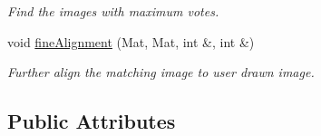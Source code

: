 \begin{DoxyCompactItemize}
\begin{DoxyCompactList}\small\item\em \-Find the images with maximum votes. \end{DoxyCompactList}\item 
\hypertarget{classMatchingImage_a79f66ca5dc56f8566dde276e1340a961}{void \hyperlink{classMatchingImage_a79f66ca5dc56f8566dde276e1340a961}{fine\-Alignment} (\-Mat, \-Mat, int \&, int \&)}\label{classMatchingImage_a79f66ca5dc56f8566dde276e1340a961}

\begin{DoxyCompactList}\small\item\em \-Further align the matching image to user drawn image. \end{DoxyCompactList}\end{DoxyCompactItemize}
\subsection*{\-Public \-Attributes}
